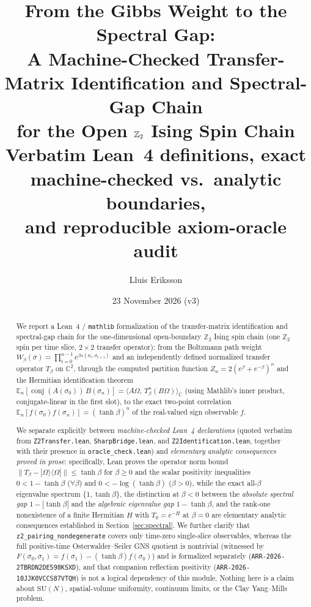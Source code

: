 \documentclass[11pt]{article}
\title{From the Gibbs Weight to the Spectral Gap:\\
A Machine-Checked Transfer-Matrix Identification and Spectral-Gap Chain\\
for the Open $\Z_2$ Ising Spin Chain\\
\large Verbatim Lean~4 definitions, exact machine-checked vs.\ analytic boundaries,\\
and reproducible axiom-oracle audit}
\author{Lluis Eriksson}
\date{23 November 2026 (v3)}
\theoremstyle{remark}
\theoremstyle{definition}
\newcommand{\lean}[1]{\texttt{#1}}
\newcommand{\C}{\mathbb{C}}
\newcommand{\Z}{\mathbb{Z}}
\newcommand{\SU}{\mathrm{SU}}
\newcommand{\Om}{\Omega}
\newcommand{\inn}[2]{\langle #1,\, #2\rangle_{\C}}
\newcommand{\Ex}{\mathbb{E}}
\newcommand{\conj}[1]{\operatorname{conj}(#1)}
\newcommand{\ket}[1]{|#1\rangle}
\newcommand{\bra}[1]{\langle #1|}
\begin{document}
\maketitle

\begin{abstract}
We report a Lean~4 / \texttt{mathlib} formalization of the transfer-matrix identification
and spectral-gap chain for the one-dimensional open-boundary $\Z_2$ Ising spin chain (one
$\Z_2$ spin per time slice, $2\times 2$ transfer operator): from the Boltzmann path weight
$W_\beta(\sigma)=\prod_{t=0}^{n-1} e^{\beta s(\sigma_t,\sigma_{t+1})}$ and an independently
defined normalized transfer operator $T_\beta$ on $\C^2$, through the computed partition
function $Z_n = 2(e^\beta+e^{-\beta})^n$ and the Hermitian identification theorem
$\Ex_n[\conj{A(\sigma_0)}\,B(\sigma_n)] = \inn{A\Om}{T_\beta^n (B\Om)}$ (using Mathlib's
inner product, conjugate-linear in the first slot), to the exact two-point correlation
$\Ex_n[f(\sigma_0)f(\sigma_n)] = (\tanh\beta)^n$ of the real-valued sign observable $f$.

We separate explicitly between \emph{machine-checked Lean~4 declarations} (quoted verbatim
from \texttt{Z2Transfer.lean}, \texttt{SharpBridge.lean}, and \texttt{Z2Identification.lean},
together with their presence in \texttt{oracle\_check.lean}) and \emph{elementary analytic
consequences proved in prose}: specifically, Lean proves the operator norm bound
$\|T_\beta - \ket{\Om}\bra{\Om}\| \le \tanh\beta$ for $\beta \ge 0$ and the scalar
positivity inequalities $0 < 1 - \tanh\beta$ ($\forall\beta$) and $0 < -\log(\tanh\beta)$
($\beta > 0$), while the exact all-$\beta$ eigenvalue spectrum $\{1, \tanh\beta\}$, the
distinction at $\beta < 0$ between the \emph{absolute spectral gap} $1 - |\tanh\beta|$ and
the \emph{algebraic eigenvalue gap} $1 - \tanh\beta$, and the rank-one nonexistence of a
finite Hermitian $H$ with $T_0 = e^{-H}$ at $\beta = 0$ are elementary analytic consequences
established in Section~\ref{sec:spectral}. We further clarify that
\lean{z2\_pairing\_nondegenerate} covers only time-zero single-slice observables, whereas
the full positive-time Osterwalder--Seiler GNS quotient is nontrivial (witnessed by
$F(\sigma_0,\sigma_1) = f(\sigma_1) - (\tanh\beta)f(\sigma_0)$) and is formalized separately
(\texttt{ARR-2026-2TBRDN2DE598KSXD}), and that companion reflection positivity
(\texttt{ARR-2026-10JJK0VCCS87VTQH}) is not a logical dependency of this module. Nothing
here is a claim about $\SU(N)$, spatial-volume uniformity, continuum limits, or the Clay
Yang--Mills problem.
\end{abstract}
\end{document}
